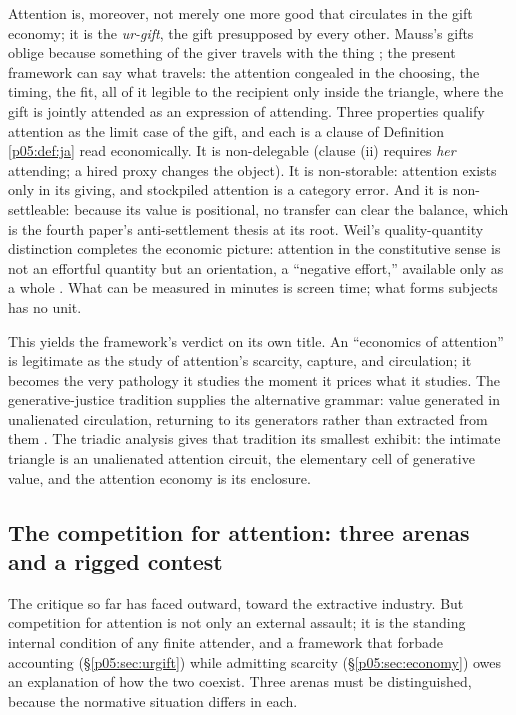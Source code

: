 \documentclass[11pt,a4paper]{article}
\theoremstyle{seriesthm}
\begin{document}
Attention is, moreover, not merely one more good that circulates in the gift economy; it is the \emph{ur-gift}, the gift presupposed by every other. Mauss's gifts oblige because something of the giver travels with the thing \parencite{mauss1990}; the present framework can say what travels: the attention congealed in the choosing, the timing, the fit, all of it legible to the recipient only inside the triangle, where the gift is jointly attended as an expression of attending. Three properties qualify attention as the limit case of the gift, and each is a clause of Definition \ref{p05:def:ja} read economically. It is non-delegable (clause (ii) requires \emph{her} attending; a hired proxy changes the object). It is non-storable: attention exists only in its giving, and stockpiled attention is a category error. And it is non-settleable: because its value is positional, no transfer can clear the balance, which is the fourth paper's anti-settlement thesis at its root. Weil's quality-quantity distinction completes the economic picture: attention in the constitutive sense is not an effortful quantity but an orientation, a ``negative effort,'' available only as a whole \parencite{weil1951, weil2002}. What can be measured in minutes is screen time; what forms subjects has no unit.

This yields the framework's verdict on its own title. An ``economics of attention'' is legitimate as the study of attention's scarcity, capture, and circulation; it becomes the very pathology it studies the moment it prices what it studies. The generative-justice tradition supplies the alternative grammar: value generated in unalienated circulation, returning to its generators rather than extracted from them \parencite{eglash2016}. The triadic analysis gives that tradition its smallest exhibit: the intimate triangle is an unalienated attention circuit, the elementary cell of generative value, and the attention economy is its enclosure.

\subsection{The competition for attention: three arenas and a rigged contest}
\label{p05:sec:competition}

The critique so far has faced outward, toward the extractive industry. But competition for attention is not only an external assault; it is the standing internal condition of any finite attender, and a framework that forbade accounting (§\ref{p05:sec:urgift}) while admitting scarcity (§\ref{p05:sec:economy}) owes an explanation of how the two coexist. Three arenas must be distinguished, because the normative situation differs in each.
\end{document}
